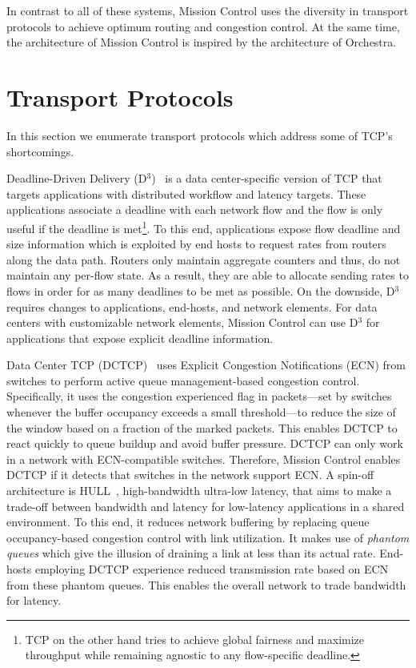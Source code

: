 \documentclass[a4paper,12pt,twoside,openright]{report}
\begin{document}
In contrast to all of these systems, Mission Control uses the diversity in
transport protocols to achieve optimum routing and congestion control. At the
same time, the architecture of Mission Control is inspired by the architecture
of Orchestra.

\section{Transport Protocols}
In this section we enumerate transport protocols which address some of
TCP's shortcomings.

Deadline-Driven Delivery (D$^3$)~\cite{Wilson:2011:BNL} is a data
center-specific version of TCP that targets applications with distributed
workflow and latency targets. These applications associate a deadline with each
network flow and the flow is only useful if the deadline is met\footnote{TCP on
the other hand tries to achieve global fairness and maximize throughput while
remaining agnostic to any flow-specific deadline.}. To this end, applications
expose flow deadline and size information which is exploited by end hosts to
request rates from routers along the data path. Routers only maintain aggregate
counters and thus, do not maintain any per-flow state. As a result, they are
able to allocate sending rates to flows in order for as many deadlines to be met
as possible. On the downside, D$^3$ requires changes to applications, end-hosts,
and network elements. For data centers with customizable network elements,
Mission Control can use D$^3$ for applications that expose explicit deadline
information.

Data Center TCP (DCTCP)~\cite{Alizadeh:2010:DCT} uses Explicit Congestion
Notifications (ECN) from switches to perform active queue management-based
congestion control. Specifically, it uses the congestion experienced flag in
packets---set by switches whenever the buffer occupancy exceeds a small
threshold---to reduce the size of the window based on a fraction of the marked
packets. This enables DCTCP to react quickly to queue buildup and avoid buffer
pressure. DCTCP can only work in a network with ECN-compatible switches.
Therefore, Mission Control enables DCTCP if it detects that switches in the
network support ECN. A spin-off architecture is HULL~\cite{Alizadeh:2012:LIM},
high-bandwidth ultra-low latency, that aims to make a trade-off between
bandwidth and latency for low-latency applications in a shared environment. To
this end, it reduces network buffering by replacing queue occupancy-based
congestion control with link utilization. It makes use of \emph{phantom queues}
which give the illusion of draining a link at less than its actual rate.
End-hosts employing DCTCP experience reduced transmission rate based on ECN from
these phantom queues. This enables the overall network to trade bandwidth for
latency.
\end{document}
